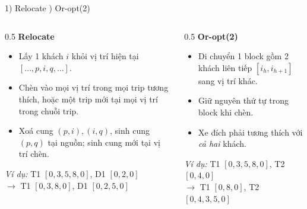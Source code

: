 \documentclass[aspectratio=169]{beamer}
\begin{document}
\begin{frame}{1) Relocate ) Or-opt(2)}
  \begin{columns}[T]
    \begin{column}{0.5\textwidth}
      \textbf{Relocate}
      \begin{itemize}
        \item \small Lấy 1 khách $i$ khỏi vị trí hiện tại $[\ldots,p,i,q,\ldots]$.
        \item \small Chèn vào mọi vị trí trong mọi trip tương thích, hoặc một trip mới tại mọi vị trí trong chuỗi trip.
        \item \small Xoá cung $(p,i),(i,q)$, sinh cung $(p,q)$ tại nguồn; sinh cung mới tại vị trí chèn.
      \end{itemize}
      \small\textit{Ví dụ:} T1 $[0,3,5,8,0]$, D1 $[0,2,0]$ \\ $\to$ T1 $[0,3,8,0]$, D1 $[0,2,5,0]$
    \end{column}
    \begin{column}{0.5\textwidth}
      \textbf{Or-opt(2)}
      \begin{itemize}
        \item \small Di chuyển 1 block gồm 2 khách liên tiếp $[i_h, i_{h+1}]$ sang vị trí khác.
        \item \small Giữ nguyên thứ tự trong block khi chèn.
        \item \small Xe đích phải tương thích với \emph{cả hai} khách.
      \end{itemize}
      \small\textit{Ví dụ:} T1 $[0,3,5,8,0]$, T2 $[0,4,0]$ \\ $\to$ T1 $[0,8,0]$, T2 $[0,4,3,5,0]$
    \end{column}
  \end{columns}
\end{frame}
\end{document}

